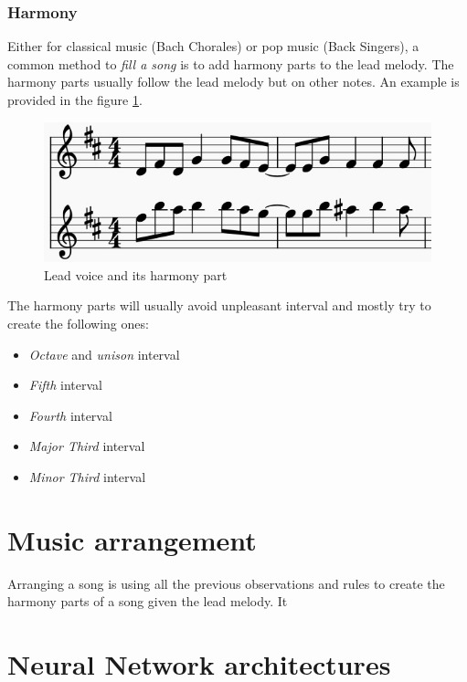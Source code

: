 \documentclass[12pt]{report}
\begin{document}
\subsubsection{Harmony}

Either for classical music (Bach Chorales) or pop music (Back Singers), a common method to \textit{fill a song} is to add harmony parts to the lead melody. The harmony parts usually follow the lead melody but on other notes.
An example is provided in the figure \ref{fig:harmony_example}.

\begin{figure}[H]
    \centering
    \includegraphics[width=0.75 \textwidth]{images/music/stave/harmony.jpg}
    \caption{Lead voice and its harmony part}
    \label{fig:harmony_example}
\end{figure}

The harmony parts will usually avoid unpleasant interval and mostly try to create the following ones: 
\begin{itemize}
    \item \textit{Octave} and \textit{unison} interval
    \item \textit{Fifth} interval
    \item \textit{Fourth} interval
    \item \textit{Major Third} interval
    \item \textit{Minor Third} interval
\end{itemize}



\section{Music arrangement}

Arranging a song is using all the previous observations and rules to create the harmony parts of a song given the lead melody. It 



\section{Neural Network architectures}
\end{document}
